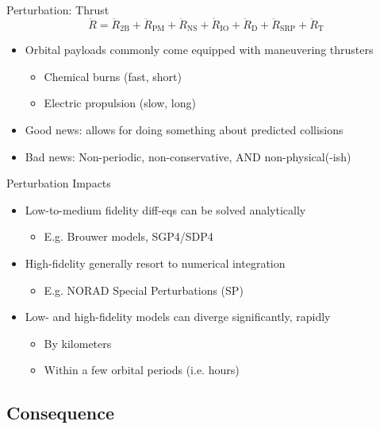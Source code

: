 \documentclass[pdf]{beamer}
\begin{document}
\begin{frame}{Perturbation: Thrust}
  \[ \ddot{R} = \ddot{R}_\text{2B} + \ddot{R}_\text{PM} + \ddot{R}_\text{NS}  + \ddot{R}_\text{IO} + \ddot{R}_\text{D} + \ddot{R}_\text{SRP} + \ddot{R}_\text{T} \]

  \begin{itemize}
  \item Orbital payloads commonly come equipped with maneuvering thrusters
    \begin{itemize}
    \item Chemical burns (fast, short)
    \item Electric propulsion (slow, long)
    \end{itemize}
  \item Good news: allows for doing something about predicted collisions
  \item Bad news: Non-periodic, non-conservative, AND non-physical(-ish)
  \end{itemize}
\end{frame}

\begin{frame}{Perturbation Impacts}
  \begin{itemize}
  \item Low-to-medium fidelity diff-eqs can be solved analytically
    \begin{itemize}
      \item E.g. Brouwer models, SGP4/SDP4
    \end{itemize}
  \item High-fidelity generally resort to numerical integration
    \begin{itemize}
      \item E.g. NORAD Special Perturbations (SP)
    \end{itemize}
  \item Low- and high-fidelity models can diverge significantly, rapidly
    \begin{itemize}
    \item By kilometers
    \item Within a few orbital periods (i.e. hours)
    \end{itemize}
  \end{itemize}
\end{frame}

\subsection{Consequence}
\end{document}
